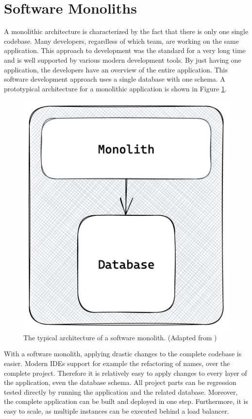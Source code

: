 \section{Software Monoliths}\label{section:background:software-monolith}

A monolithic architecture is characterized by the fact that there is only one single codebase. Many developers, regardless of which team, are working on the same application. This approach to development was the standard for a very long time and is well supported by various modern development tools. By just having one application, the developers have an overview of the entire application. This software development approach uses a single database with one schema. A prototypical architecture for a monolithic application is shown in Figure \ref{fig:background:monolith:monolith-sketch}.

\ifshowImages
\begin{figure}[H]
  \centering
  \includegraphics[width=0.3\linewidth]{images/background/monolith/monolith-sketch.png}
  \caption{The typical architecture of a software monolith. (Adapted from \cite[12]{book:2019:newman:background:monolith:monolith-to-microservices})}\label{fig:background:monolith:monolith-sketch}
\end{figure}
\fi

\noindent With a software monolith, applying drastic changes to the complete codebase is easier. Modern \acp{IDE} support for example the refactoring of names, over the complete project. Therefore it is relatively easy to apply changes to every layer of the application, even the database schema. All project parts can be regression tested directly by running the application and the related database. Moreover, the complete application can be built and deployed in one step. Furthermore, it is easy to scale, as multiple instances can be executed behind a load balancer. \cite[4]{book:2018:richardson:background:bff:microservices-patterns}

\bigskip


